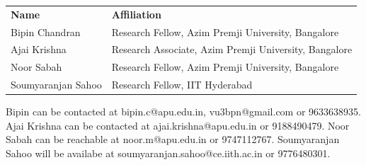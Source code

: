 
\textbf{\team}


\begin{tabular}{ll}
    \textbf{ Name} & \textbf{Affiliation} \\
    Bipin Chandran  &  Research Fellow, Azim Premji University, Bangalore \\
    Ajai Krishna &  Research Associate, Azim Premji University, Bangalore \\
    Noor Sabah & Research Fellow, Azim Premji University, Bangalore \\
    Soumyaranjan Sahoo & Research Fellow, IIT Hyderabad \\
\end{tabular}

Bipin can be contacted at bipin.c@apu.edu.in, vu3bpn@gmail.com or 9633638935.\linebreak
Ajai Krishna can be contacted at ajai.krishna@apu.edu.in or 9188490479.\linebreak
Noor Sabah  can be reachable at noor.m@apu.edu.in or 9747112767.\linebreak
Soumyaranjan Sahoo  will be availabe at soumyaranjan.sahoo@ce.iith.ac.in  or  9776480301.\linebreak
